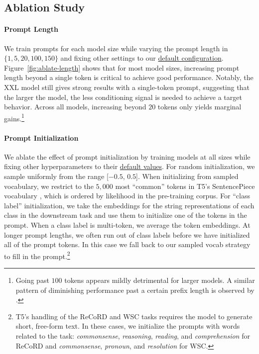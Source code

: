 \documentclass[11pt]{article}
\begin{document}
\subsection{Ablation Study}
\label{sec:ablations}

\paragraph{Prompt Length} We train prompts for each model size while varying the prompt length in $\{1, 5, 20, 100, 150\}$ and fixing other settings to our \hyperref[settings:default]{default configuration}. Figure~\ref{fig:ablate-length} shows that for most model sizes, increasing prompt length beyond a single token is critical to achieve good performance. Notably, the XXL model still gives strong results with a single-token prompt, suggesting that the larger the model, the less conditioning signal is needed to achieve a target behavior. Across all models, increasing beyond $20$ tokens only yields marginal gains.\footnote{Going past $100$ tokens appears mildly detrimental for larger models. A similar pattern of diminishing performance past a certain prefix length is observed by \citet{li_2021_prefix_tuning}.}

\paragraph{Prompt Initialization} We ablate the effect of prompt initialization by training models at all sizes while fixing other hyperparameters to their \hyperref[settings:default]{default values}. For random initialization, we sample uniformly from the range [$-0.5$, $0.5$]. When initializing from sampled vocabulary, we restrict to the $5{,}000$ most ``common'' tokens in T5's SentencePiece vocabulary \cite{kudo2018sentencepiece}, which is ordered by likelihood in the pre-training corpus. For ``class label'' initialization, we take the embeddings for the string representations of each class in the downstream task and use them to initialize one of the tokens in the prompt. When a class label is multi-token, we average the token embeddings. At longer prompt lengths, we often run out of class labels before we have initialized all of the prompt tokens. In this case we fall back to our sampled vocab strategy to fill in the prompt.\footnote{T5's handling of the ReCoRD and WSC tasks requires the model to generate short, free-form text. In these cases, we initialize the prompts with words related to the task: \textit{commonsense}, \textit{reasoning}, \textit{reading}, and \textit{comprehension} for ReCoRD and \textit{commonsense}, \textit{pronoun}, and \textit{resolution} for WSC.}
\end{document}
